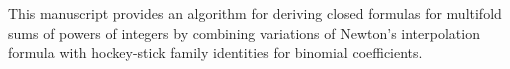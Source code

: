 This manuscript provides an algorithm for deriving closed formulas for multifold sums of powers of integers by combining variations of Newton's interpolation formula with hockey-stick family identities for binomial coefficients.
